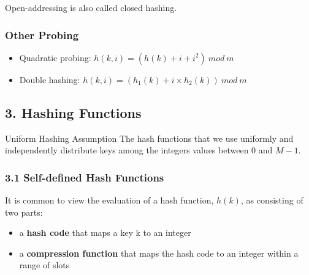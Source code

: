 \documentclass[aspectratio=169, 14pt]{beamer}
\begin{document}
{
\begin{frame}[standout]
	Open-addressing is also called closed hashing.
\end{frame}
}

\begin{frame}
	\frametitle{Other Probing}

	\begin{itemize}
		\item Quadratic probing: $h(k, i) = (h(k) + i + i^2) \ mod \ m$
		\item Double hashing: $h(k, i) = (h_1(k) + i \times h_2(k)) \ mod \ m$
	\end{itemize}

\end{frame}

\begin{frame}

	\section{\textcolor{darkmidnightblue}{3. Hashing Functions}}

	\begin{exampleblock}{Uniform Hashing Assumption}
		The hash functions that we use uniformly and independently distribute keys among the integers values between $0$ and $M - 1$.
	\end{exampleblock}

\end{frame}

\begin{frame}
	\frametitle{3.1 Self-defined Hash Functions}


	It is common to view the evaluation of a hash function, $h(k)$, as consisting of two parts:
	\begin{itemize}
		\item a \textbf{hash code} that maps a key k to an integer
		\item a \textbf{compression function} that maps the hash code to an integer within a range of slots
	\end{itemize}

\end{frame}
\end{document}
